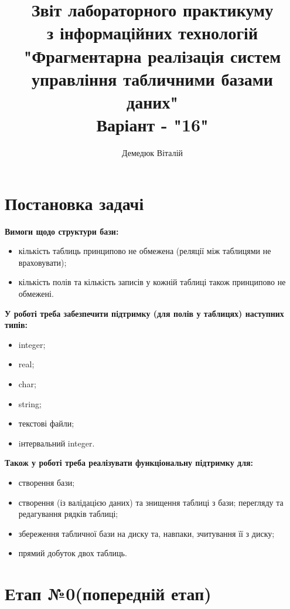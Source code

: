 \documentclass[a4paper, 12pt]{article}
\author{Демедюк Віталій}
\title{Звіт лабораторного практикуму\\
       з інформаційних технологій\\
       "Фрагментарна реалізація систем управління табличними базами даних"\\
       Варіант - "16"}
\begin{document}
\maketitle

\newpage

\tableofcontents

\newpage

\section{Постановка задачі}

\textbf{Вимоги щодо структури бази:}

\begin{itemize}
\item кількість таблиць принципово не обмежена (реляції між таблицями не враховувати);
\item кількість полів та кількість записів у кожній таблиці також принципово не обмежені.
\end{itemize}


\textbf{У роботі треба забезпечити підтримку (для полів у таблицях) наступних типів:}

\begin{itemize}
\item integer;
\item real;
\item char;
\item string;
\item текстові файли;
\item iнтервальний integer.
\end{itemize}

\textbf{Також у роботі треба реалізувати функціональну підтримку для:}

\begin{itemize}
\item створення бази;
\item створення (із валідацією даних) та знищення таблиці з бази;
перегляду та редагування рядків таблиці;
\item збереження табличної бази на диску та, навпаки, зчитування її з диску;
\item прямий добуток двох таблиць.
\end{itemize}

\section{Етап №0(попередній етап)}
\end{document}
